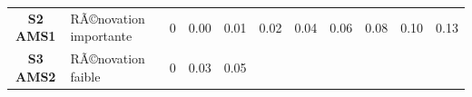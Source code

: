 \documentclass[]{article}
\begin{document}
\begin{longtable}[]{@{}clrrrrrrrrr@{}}
\begin{minipage}[t]{0.12\columnwidth}
\textbf{S2 AMS1}\strut
\end{minipage} & \begin{minipage}[t]{0.17\columnwidth}\raggedright\strut
RÃ©novation importante\strut
\end{minipage} & \begin{minipage}[t]{0.05\columnwidth}\raggedleft\strut
0\strut
\end{minipage} & \begin{minipage}[t]{0.05\columnwidth}\raggedleft\strut
0.00\strut
\end{minipage} & \begin{minipage}[t]{0.05\columnwidth}\raggedleft\strut
0.01\strut
\end{minipage} & \begin{minipage}[t]{0.05\columnwidth}\raggedleft\strut
0.02\strut
\end{minipage} & \begin{minipage}[t]{0.05\columnwidth}\raggedleft\strut
0.04\strut
\end{minipage} & \begin{minipage}[t]{0.05\columnwidth}\raggedleft\strut
0.06\strut
\end{minipage} & \begin{minipage}[t]{0.05\columnwidth}\raggedleft\strut
0.08\strut
\end{minipage} & \begin{minipage}[t]{0.05\columnwidth}\raggedleft\strut
0.10\strut
\end{minipage} & \begin{minipage}[t]{0.05\columnwidth}\raggedleft\strut
0.13\strut
\end{minipage}\tabularnewline
\begin{minipage}[t]{0.12\columnwidth}\centering\strut
\textbf{S3 AMS2}\strut
\end{minipage} & \begin{minipage}[t]{0.17\columnwidth}\raggedright\strut
RÃ©novation faible\strut
\end{minipage} & \begin{minipage}[t]{0.05\columnwidth}\raggedleft\strut
0\strut
\end{minipage} & \begin{minipage}[t]{0.05\columnwidth}\raggedleft\strut
0.03\strut
\end{minipage} & \begin{minipage}[t]{0.05\columnwidth}\raggedleft\strut
0.05\strut
\end{minipage} & \begin{minipage}[t]{0.05\columnwidth}\raggedleft\strut

\end{minipage}
\end{longtable}
\end{document}
